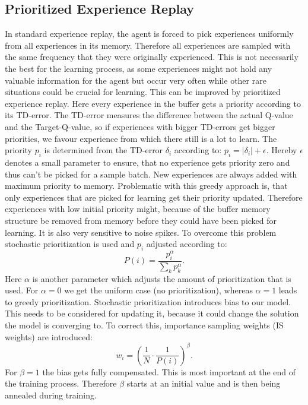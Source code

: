 \documentclass[12pt]{article}
\begin{document}
\subsection{Prioritized Experience Replay}
In standard experience replay, the agent is forced to pick experiences uniformly from all experiences in its memory. Therefore all experiences are sampled with the same frequency that they were originally experienced.
This is not necessarily the best for the learning process, as some experiences might not hold any valuable information for the agent but occur very often while other rare situations could be crucial for learning.
This can be improved by prioritized experience replay. Here every experience in the buffer gets a priority according to its TD-error.
The TD-error measures the difference between the actual Q-value and the Target-Q-value, so if experiences with bigger TD-errors get bigger priorities, we favour experience from which there still is a lot to learn.
The priority $p_i$ is determined from the TD-error $\delta_i$ according to:
$p_{i}=\left|\delta_{i}\right|+\epsilon $. Hereby $\epsilon$ denotes a small parameter to ensure, that no experience gets priority zero and thus can't be picked for a sample batch.
New experiences are always added with maximum priority to memory.
Problematic with this greedy approach is, that only experiences that are picked for learning get their priority updated. Therefore experiences with low initial priority might, because of the buffer memory structure be removed from memory before they could have been picked for learning. It is also very sensitive to noise spikes.
To overcome this problem stochastic prioritization is used and $p_i$ adjusted according to:
\begin{equation}
P(i)=\frac{p_{i}^{\alpha}}{\sum_{k} p_{k}^{\alpha}}.
\end{equation}
Here $\alpha$ is another parameter which adjusts the amount of prioritization that is used. For $\alpha=0$ we get the uniform case (no prioritization), whereas $\alpha=1$ leads to greedy prioritization.
Stochastic prioritization introduces bias to our model. This needs to be considered for updating it, because it could change the solution the model is converging to. To correct this, importance sampling weights (IS weights) are introduced: 
\begin{equation}
w_{i}=\left(\frac{1}{N} \cdot \frac{1}{P(i)}\right)^{\beta}.
\end{equation}
For $\beta=1$ the bias gets fully compensated. This is most important at the end of the training process. Therefore $\beta$ starts at an initial value and is then being annealed during training. \\\\
\end{document}
